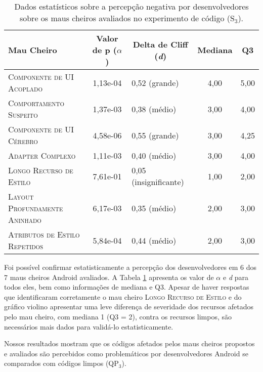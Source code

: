 \begin{table}[!htb]
\centering
\renewcommand*{\arraystretch}{1}
\footnotesize
\caption{Dados estatísticos sobre a percepção negativa por desenvolvedores sobre os maus cheiros avaliados no experimento de código (S$_3$).}
\begin{tabular}{@{}p{7cm}clcc@{}}
\toprule
\textbf{Mau Cheiro} & \multicolumn{1}{c}{\textbf{Valor de p ($\alpha$)}} & \multicolumn{1}{c}{\textbf{Delta de Cliff (\textit{d})}} & \textbf{Mediana} & \textbf{Q3} \\
\toprule
\textsc{\small Componente de UI Acoplado}       &  1,13e-04  &    0,52 (grande) & 4,00         & 5,00 \\
\textsc{\small Comportamento Suspeito}          &  1,37e-03  &    0,38 (médio)  & 3,00         & 4,00 \\
\textsc{\small Componente de UI Cérebro}        &  4,58e-06  &    0,55 (grande) & 3,00         & 4,25 \\
\textsc{\small Adapter Complexo}                &  1,11e-03  &    0,40 (médio)  & 3,00         & 4,00 \\
\textsc{\small Longo Recurso de Estilo}         &  7,61e-01  &    0,05 (insignificante) & 1,00 & 2,00 \\
\textsc{\small Layout Profundamente Aninhado}   &  6,17e-03  &    0,35 (médio)  & 2,00         & 3,00 \\
\textsc{\small Atributos de Estilo Repetidos}   &  5,84e-04  &    0,44 (médio)  & 2,00         & 3,00 \\
\bottomrule
\end{tabular}
\label{tab:smells-avaliados}
\end{table}


Foi possível confirmar estatisticamente a percepção dos desenvolvedores em 6 dos 7 maus cheiros Android avaliados. A Tabela \ref{tab:smells-avaliados} apresenta os valor de $\alpha$ e \textit{d} para todos eles, bem como informações de mediana e Q3. Apesar de haver respostas que identificaram corretamente o mau cheiro \textsc{\small Longo Recurso de Estilo} e do gráfico violino apresentar uma leve diferença de severidade dos recursos afetados pelo mau cheiro, com mediana 1 (Q3 = 2), contra os recursos limpos, são necessários mais dados para validá-lo estatisticamente. \\

\begin{square}
  \small
  Nossos resultados mostram que os códigos afetados pelos maus cheiros propostos e avaliados são percebidos como problemáticos por desenvolvedores Android se comparados com códigos limpos (QP$_3$).
\end{square}

